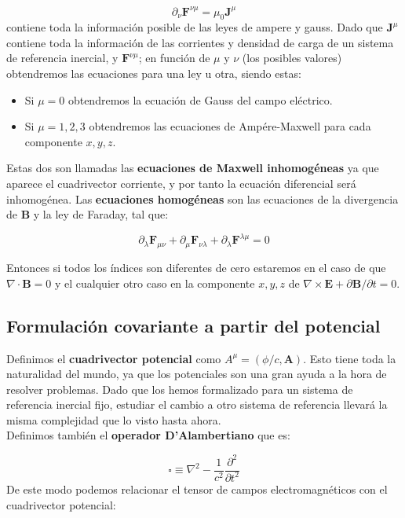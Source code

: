 \documentclass[12pt,a4paper]{article}
\newcommand{\parciales}[2]{\frac{\partial #1}{\partial #2}}
\newcommand{\rota}{\nabla \times}
\newcommand{\dive}{\nabla \cdot}
\newcommand{\Bn}{\mathbf{B}}
\newcommand{\En}{\mathbf{E}}
\newcommand{\Jn}{\mathbf{J}}
\newcommand{\Fn}{\mathbf{F}}
\newcommand{\An}{\mathbf{A}}
\numberwithin{equation}{section}
\numberwithin{figure}{section}
\begin{document}
\begin{equation}
\partial_\nu \Fn^{\nu \mu} = \mu_0 \Jn^\mu 
\end{equation}
contiene toda la información posible de las leyes de ampere y gauss. Dado que $\Jn^\mu$ contiene toda la información de las corrientes y densidad de carga de un sistema de referencia inercial, y $\Fn^{\nu \mu}$; en función de $\mu$ y $\nu$ (los posibles valores) obtendremos las ecuaciones para una ley u otra, siendo estas:

\begin{itemize}
\item Si $\mu=0$ obtendremos la ecuación de Gauss del campo eléctrico.
\item Si $\mu=1,2,3$ obtendremos las ecuaciones de Ampére-Maxwell para cada componente $x,y,z$.
\end{itemize}

Estas dos son llamadas las \textbf{ecuaciones de Maxwell inhomogéneas} ya que aparece el cuadrivector corriente, y por tanto la ecuación diferencial será inhomogénea. Las \textbf{ecuaciones homogéneas} son las ecuaciones de la divergencia de $\Bn$ y la ley de Faraday, tal que:

\begin{equation}
\partial_\lambda \Fn_{\mu \nu} + \partial_\mu \Fn_{\nu \lambda} + \partial_\lambda \Fn^{\lambda \mu} = 0
\end{equation}

Entonces si todos los índices son diferentes de cero estaremos en el caso de que $\dive \Bn = 0$ y el cualquier otro caso en la componente $x,y,z$ de $\rota \En+ \partial \Bn / \partial t = 0$. 

\subsection{Formulación covariante a partir del potencial}

Definimos el \textbf{cuadrivector potencial} como $A^\mu = (\phi/c,\An)$. Esto tiene toda la naturalidad del mundo, ya que los potenciales son una gran ayuda a la hora de resolver problemas. Dado que los hemos formalizado para un sistema de referencia inercial fijo, estudiar el cambio a otro sistema de referencia llevará la misma complejidad que lo visto hasta ahora. \\

Definimos también el \textbf{operador D'Alambertiano} que es:

\begin{equation}
\square \equiv \nabla^2 - \dfrac{1}{c^2} \parciales{^2}{t^2}
\end{equation}
De este modo podemos relacionar el tensor de campos electromagnéticos con el cuadrivector potencial:
\end{document}
